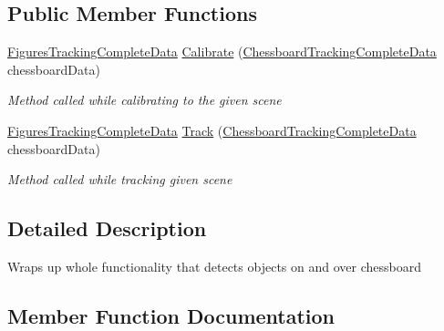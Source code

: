 \subsection*{Public Member Functions}
\begin{DoxyCompactItemize}
\item 
\mbox{\hyperlink{class_chess_tracking_1_1_image_processing_1_1_pipeline_data_1_1_figures_tracking_complete_data}{Figures\+Tracking\+Complete\+Data}} \mbox{\hyperlink{interface_chess_tracking_1_1_image_processing_1_1_pipeline_parts_1_1_stages_interfaces_1_1_i_figures_localization_a6d7306330fd25133e389b0f5b02af6e8}{Calibrate}} (\mbox{\hyperlink{class_chess_tracking_1_1_image_processing_1_1_pipeline_data_1_1_chessboard_tracking_complete_data}{Chessboard\+Tracking\+Complete\+Data}} chessboard\+Data)
\begin{DoxyCompactList}\small\item\em Method called while calibrating to the given scene \end{DoxyCompactList}\item 
\mbox{\hyperlink{class_chess_tracking_1_1_image_processing_1_1_pipeline_data_1_1_figures_tracking_complete_data}{Figures\+Tracking\+Complete\+Data}} \mbox{\hyperlink{interface_chess_tracking_1_1_image_processing_1_1_pipeline_parts_1_1_stages_interfaces_1_1_i_figures_localization_aaa05ccf9e70cdf5a9f11dc967cfb2d39}{Track}} (\mbox{\hyperlink{class_chess_tracking_1_1_image_processing_1_1_pipeline_data_1_1_chessboard_tracking_complete_data}{Chessboard\+Tracking\+Complete\+Data}} chessboard\+Data)
\begin{DoxyCompactList}\small\item\em Method called while tracking given scene \end{DoxyCompactList}\end{DoxyCompactItemize}


\subsection{Detailed Description}
Wraps up whole functionality that detects objects on and over chessboard 



\subsection{Member Function Documentation}
\mbox{\label{interface_chess_tracking_1_1_image_processing_1_1_pipeline_parts_1_1_stages_interfaces_1_1_i_figures_localization_a6d7306330fd25133e389b0f5b02af6e8}} 

